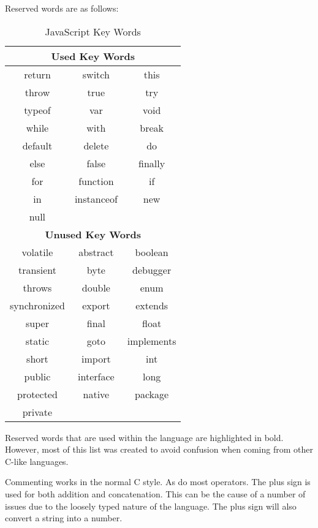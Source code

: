 			Reserved words are as follows:
			\begin{table}[htb]
				\centering
				\begin{tabular}{|c|c|c|}
					\hline
					\multicolumn{3}{|c|}{\textbf{Used Key Words}} \\ \hline
					return & switch & this \\ \hline
					throw & true & try \\ \hline
					typeof & var & void \\ \hline
					while & with & break \\ \hline
					default & delete & do \\ \hline 
					else & false & finally \\ \hline 
					for & function & if \\ \hline 
					in & instanceof & new  \\ \hline
					null & & \\ \hline
					\hline
					\multicolumn{3}{|c|}{\textbf{Unused Key Words}} \\ \hline
					volatile & abstract & boolean \\ \hline
					transient & byte & debugger \\ \hline
					throws & double & enum \\ \hline
					synchronized & export & extends \\ \hline
					super & final & float \\ \hline
					static & goto & implements \\ \hline
					short & import & int \\ \hline
					public & interface & long \\ \hline
					protected & native & package \\ \hline
					private & & \\ \hline
				 \end{tabular}
				 \caption{JavaScript Key Words}
				 \label{tab:JSKeyWords}
			 \end{table}
			Reserved words that are used within the language are highlighted in bold. 
			However, most of this list was created to avoid confusion when coming from other C-like languages. 

			Commenting works in the normal C style. 
			As do most operators. 
			The plus sign is used for both addition and concatenation. 
			This can be the cause of a number of issues due to the loosely typed nature of the language. 
			The plus sign will also convert a string into a number. 

